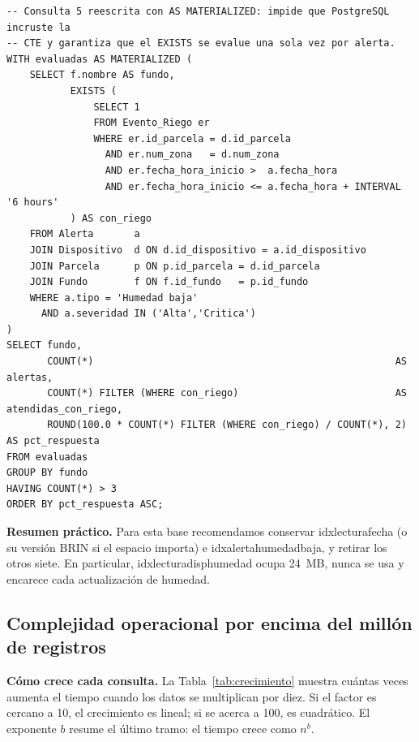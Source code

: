 \documentclass[11pt,letterpaper]{article}
\newcommand{\tbus}{\textunderscore\allowbreak}
\newcommand{\tb}[1]{{\ttfamily\let\_\tbus #1}}
\begin{document}
\begin{lstlisting}[style=sql, title={03c\_consulta5\_materializada.sql}]
-- Consulta 5 reescrita con AS MATERIALIZED: impide que PostgreSQL incruste la
-- CTE y garantiza que el EXISTS se evalue una sola vez por alerta.
WITH evaluadas AS MATERIALIZED (
    SELECT f.nombre AS fundo,
           EXISTS (
               SELECT 1
               FROM Evento_Riego er
               WHERE er.id_parcela = d.id_parcela
                 AND er.num_zona   = d.num_zona
                 AND er.fecha_hora_inicio >  a.fecha_hora
                 AND er.fecha_hora_inicio <= a.fecha_hora + INTERVAL '6 hours'
           ) AS con_riego
    FROM Alerta       a
    JOIN Dispositivo  d ON d.id_dispositivo = a.id_dispositivo
    JOIN Parcela      p ON p.id_parcela = d.id_parcela
    JOIN Fundo        f ON f.id_fundo   = p.id_fundo
    WHERE a.tipo = 'Humedad baja'
      AND a.severidad IN ('Alta','Critica')
)
SELECT fundo,
       COUNT(*)                                                    AS alertas,
       COUNT(*) FILTER (WHERE con_riego)                           AS atendidas_con_riego,
       ROUND(100.0 * COUNT(*) FILTER (WHERE con_riego) / COUNT(*), 2) AS pct_respuesta
FROM evaluadas
GROUP BY fundo
HAVING COUNT(*) > 3
ORDER BY pct_respuesta ASC;
\end{lstlisting}


\textbf{Resumen práctico.} Para esta base recomendamos conservar \tb{idx\_lectura\_fecha} (o su versión BRIN si el espacio importa) e \tb{idx\_alerta\_humedad\_baja}, y retirar los otros siete. En particular, \tb{idx\_lectura\_disp\_humedad} ocupa 24~MB, nunca se usa y encarece cada actualización de humedad.

\subsection{Complejidad operacional por encima del millón de registros}
\label{sec:extra}

\textbf{Cómo crece cada consulta.} La Tabla~\ref{tab:crecimiento} muestra cuántas veces aumenta el tiempo cuando los datos se multiplican por diez. Si el factor es cercano a 10, el crecimiento es lineal; si se acerca a 100, es cuadrático. El exponente $b$ resume el último tramo: el tiempo crece como $n^b$.
\end{document}
